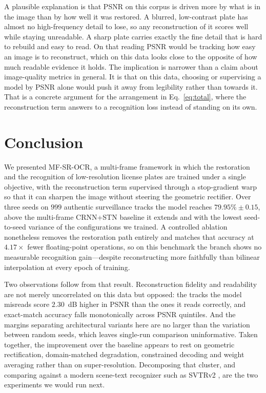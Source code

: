 \documentclass[runningheads]{llncs}
\begin{document}
A plausible explanation is that PSNR on this corpus is driven more by what is in the image than by how well it was restored. A blurred, low-contrast plate has almost no high-frequency detail to lose, so any reconstruction of it scores well while staying unreadable. A sharp plate carries exactly the fine detail that is hard to rebuild and easy to read. On that reading PSNR would be tracking how easy an image is to reconstruct, which on this data looks close to the opposite of how much readable evidence it holds. The implication is narrower than a claim about image-quality metrics in general. It is that on this data, choosing or supervising a model by PSNR alone would push it away from legibility rather than towards it. That is a concrete argument for the arrangement in Eq.~\eqref{eq:total}, where the reconstruction term answers to a recognition loss instead of standing on its own.


\section{Conclusion}
\label{sec:conclusion}

We presented MF-SR-OCR, a multi-frame framework in which the restoration and the recognition of low-resolution license plates are trained under a single objective, with the reconstruction term supervised through a stop-gradient warp so that it can sharpen the image without steering the geometric rectifier. Over three seeds on $999$ authentic surveillance tracks the model reaches $79.95\% \pm 0.15$, above the multi-frame CRNN+STN baseline it extends and with the lowest seed-to-seed variance of the configurations we trained. A controlled ablation nonetheless removes the restoration path entirely and matches that accuracy at $4.17\times$ fewer floating-point operations, so on this benchmark the branch shows no measurable recognition gain---despite reconstructing more faithfully than bilinear interpolation at every epoch of training.

Two observations follow from that result. Reconstruction fidelity and readability are not merely uncorrelated on this data but opposed: the tracks the model misreads score $2.30$~dB higher in PSNR than the ones it reads correctly, and exact-match accuracy falls monotonically across PSNR quintiles. And the margins separating architectural variants here are no larger than the variation between random seeds, which leaves single-run comparison uninformative. Taken together, the improvement over the baseline appears to rest on geometric rectification, domain-matched degradation, constrained decoding and weight averaging rather than on super-resolution. Decomposing that cluster, and comparing against a modern scene-text recognizer such as SVTRv2 \cite{du2025svtrv2}, are the two experiments we would run next.
\end{document}
